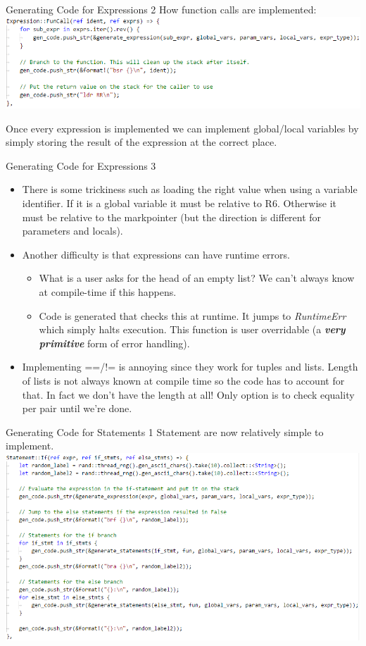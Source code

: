\documentclass[10pt]{beamer}
\begin{document}
\begin{frame}{Generating Code for Expressions 2}
How function calls are implemented:
\includegraphics[width=\textwidth]{presentation3/4.png}

Once every expression is implemented we can implement global/local variables by simply storing the result of the expression at the correct place.
\end{frame}

\begin{frame}{Generating Code for Expressions 3}
    \begin{itemize}
        \item There is some trickiness such as loading the right value when using a variable identifier. If it is a global variable it must be relative to R6. Otherwise it must be relative to the markpointer (but the direction is different for parameters and locals).
        \item Another difficulty is that expressions can have runtime errors.
        \begin{itemize}
            \item What is a user asks for the head of an empty list? We can't always know at compile-time if this happens.
            \item Code is generated that checks this at runtime. It jumps to \textit{RuntimeErr} which simply halts execution. This function is user overridable (a \textbf{\textit{very primitive}} form of error handling).
        \end{itemize}
        \item Implementing ==/!= is annoying since they work for tuples and lists. Length of lists is not always known at compile time so the code has to account for that. In fact we don't have the length at all! Only option is to check equality per pair until we're done.
    \end{itemize}
\end{frame}

\begin{frame}{Generating Code for Statements 1}
Statement are now relatively simple to implement.
\includegraphics[width=\textwidth]{presentation3/5.png}
\end{frame}
\end{document}
